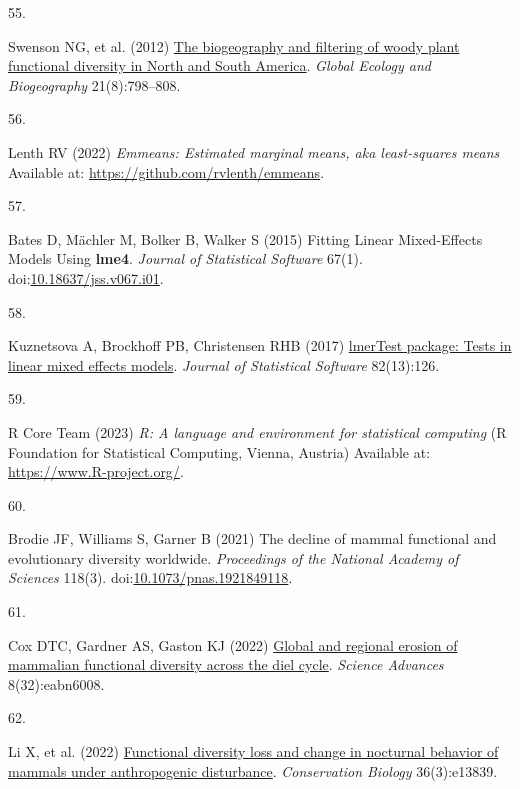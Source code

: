 \documentclass{article}
\newlength{\cslhangindent}
\newlength{\csllabelwidth}
\newlength{\cslentryspacingunit} %
\newenvironment{CSLReferences}[2] %
 {%
  \setlength{\parindent}{0pt}
  \ifodd #1
  \let\oldpar\par
  \def\par{\hangindent=\cslhangindent\oldpar}
  \fi
  \setlength{\parskip}{#2\cslentryspacingunit}
 }%
 {}
\newcommand{\CSLLeftMargin}[1]{\parbox[t]{\csllabelwidth}{#1}}
\newcommand{\CSLRightInline}[1]{\parbox[t]{\linewidth - \csllabelwidth}{#1}\break}
\begin{document}
\begin{CSLReferences}{0}{0}
\leavevmode{}%
\CSLLeftMargin{55. }%
\CSLRightInline{Swenson NG, et al. (2012)
\href{https://doi.org/10.1111/j.1466-8238.2011.00727.x}{The biogeography
and filtering of woody plant functional diversity in North and South
America}. \emph{Global Ecology and Biogeography} 21(8):798--808.}

\leavevmode{}%
\CSLLeftMargin{56. }%
\CSLRightInline{Lenth RV (2022) \emph{Emmeans: Estimated marginal means,
aka least-squares means} Available at:
\url{https://github.com/rvlenth/emmeans}.}

\leavevmode{}%
\CSLLeftMargin{57. }%
\CSLRightInline{Bates D, Mächler M, Bolker B, Walker S (2015) Fitting
Linear Mixed-Effects Models Using {\textbf{lme4}}. \emph{Journal of
Statistical Software} 67(1).
doi:\href{https://doi.org/10.18637/jss.v067.i01}{10.18637/jss.v067.i01}.}

\leavevmode{}%
\CSLLeftMargin{58. }%
\CSLRightInline{Kuznetsova A, Brockhoff PB, Christensen RHB (2017)
\href{https://doi.org/10.18637/jss.v082.i13}{lmerTest package: Tests in
linear mixed effects models}. \emph{Journal of Statistical Software}
82(13):126.}

\leavevmode{}%
\CSLLeftMargin{59. }%
\CSLRightInline{R Core Team (2023) \emph{R: A language and environment
for statistical computing} (R Foundation for Statistical Computing,
Vienna, Austria) Available at: \url{https://www.R-project.org/}.}

\leavevmode{}%
\CSLLeftMargin{60. }%
\CSLRightInline{Brodie JF, Williams S, Garner B (2021) The decline of
mammal functional and evolutionary diversity worldwide.
\emph{Proceedings of the National Academy of Sciences} 118(3).
doi:\href{https://doi.org/10.1073/pnas.1921849118}{10.1073/pnas.1921849118}.}

\leavevmode{}%
\CSLLeftMargin{61. }%
\CSLRightInline{Cox DTC, Gardner AS, Gaston KJ (2022)
\href{https://doi.org/10.1126/sciadv.abn6008}{Global and regional
erosion of mammalian functional diversity across the diel cycle}.
\emph{Science Advances} 8(32):eabn6008.}

\leavevmode{}%
\CSLLeftMargin{62. }%
\CSLRightInline{Li X, et al. (2022)
\href{https://doi.org/10.1111/cobi.13839}{Functional diversity loss and
change in nocturnal behavior of mammals under anthropogenic
disturbance}. \emph{Conservation Biology} 36(3):e13839.}


\end{CSLReferences}
\end{document}
